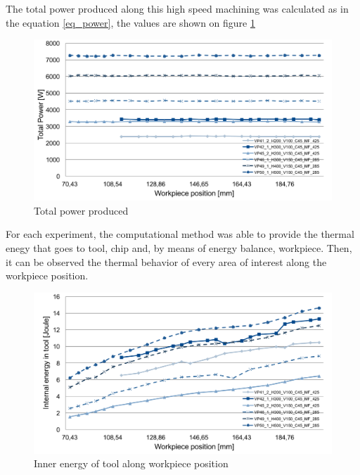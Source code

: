 	The total power produced along this high speed machining was calculated as in the equation \ref{eq_power}, the values are shown on figure \ref{fig:totPower}

	\begin{figure}[H]
		\centering
		\captionsetup{justification=centering}
		\includegraphics[scale=0.6]{Imagens/Total_power.png}
		\caption{Total power produced}
		\label{fig:totPower}
	\end{figure}

	For each experiment, the computational method was able to provide the thermal enegy that goes to tool, chip and, by means of energy balance, workpiece. Then, it can be observed the thermal behavior of every area of interest along the workpiece position.

	\begin{figure}[H]
		\centering
		\captionsetup{justification=centering}
		\includegraphics[scale=0.6]{Imagens/Inner_Energy.png}
		\caption{Inner energy of tool along workpiece position}
		\label{fig:innerTool}
	\end{figure}

